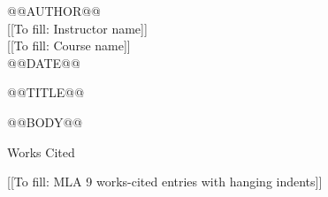 \documentclass[12pt,letterpaper]{article}
\renewcommand{\missingfield}[1]{\textcolor{red!70!black}{[[To fill: #1]]}}
\begin{document}
\noindent @@AUTHOR@@\\
\missingfield{Instructor name}\\
\missingfield{Course name}\\
@@DATE@@

\begin{center}@@TITLE@@\end{center}
@@BODY@@

\newpage
\begin{center}Works Cited\end{center}
\noindent\missingfield{MLA 9 works-cited entries with hanging indents}
\end{document}
